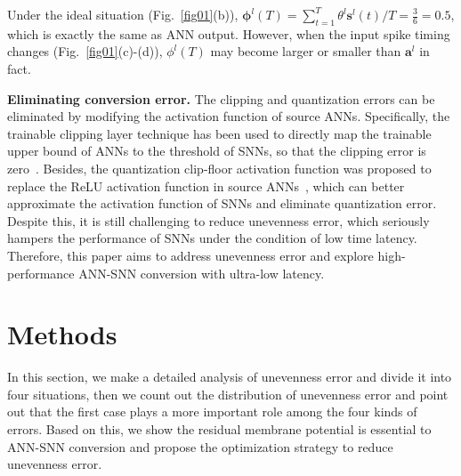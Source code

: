 \documentclass[letterpaper]{article} %
\begin{document}
\begin{itemize}
    Under the ideal situation (Fig.~\ref{fig01}(b)), $\boldsymbol{\phi}^l(T) = \sum\limits_{t=1}^T{\theta}^{l} \boldsymbol{s}^{l}(t)/{T}=\frac{3}{6}=0.5$, which is exactly the same as ANN output. However, when the input spike timing changes
    (Fig.~\ref{fig01}(c)-(d)), $\phi^l(T)$ may become larger or smaller than $\boldsymbol{a}^l$ in fact.
\end{itemize}
\textbf{Eliminating conversion error.} The clipping and quantization errors can be eliminated by modifying the activation function of source ANNs. Specifically, the trainable clipping layer technique has been used to directly map the trainable upper bound of ANNs to the threshold of SNNs, so that the clipping error is zero~\cite{ho2021tcl}. Besides, the quantization clip-floor activation function was proposed to replace the ReLU activation function in source ANNs~\cite{bu2022optimal}, which can better approximate the activation function of SNNs and eliminate quantization error. Despite this, it is still challenging to reduce unevenness error, which seriously hampers the performance of SNNs under the condition of low time latency. Therefore, this paper aims to address unevenness error and explore high-performance
ANN-SNN conversion with ultra-low latency.




\section{Methods}
In this section, we make a detailed analysis of unevenness error and divide it into four situations, then we count out the distribution of unevenness error and point out that the first case plays a more important role among the four kinds of errors.
Based on this, we show the residual membrane potential is essential to ANN-SNN conversion and propose the optimization strategy to reduce unevenness error.
\end{document}
